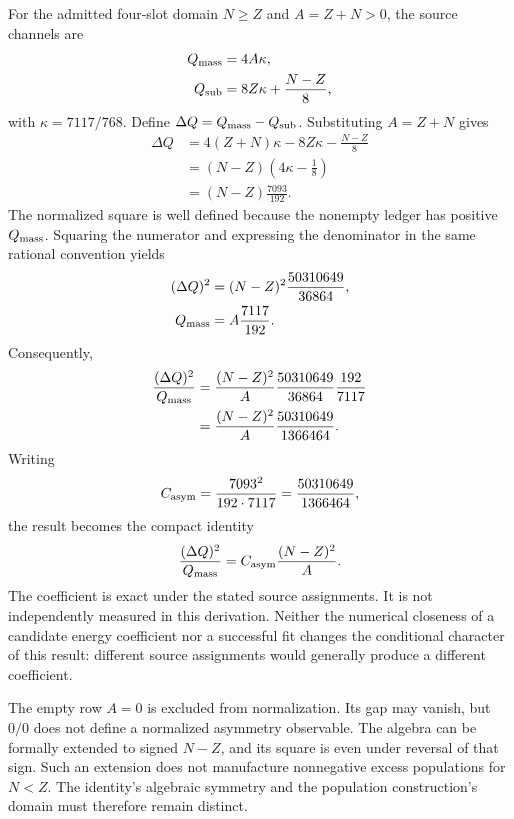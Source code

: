 For the admitted four-slot domain $N\geq Z$ and $A=Z+N>0$, the source channels are
\begin{align}
 Q_{\rm mass}&=4A\kappa,\nonumber\\
 Q_{\rm sub}&=8Z\kappa+\frac{N-Z}{8},
 \label{v2c5:channels}
\end{align}
with $\kappa=7117/768$. Define $\Delta Q=Q_{\rm mass}-Q_{\rm sub}$. Substituting $A=Z+N$ gives
\begin{align}
 \Delta Q
 &=4(Z+N)\kappa-8Z\kappa-\frac{N-Z}{8}\nonumber\\
 &=(N-Z)\left(4\kappa-\frac18\right)\nonumber\\
 &=(N-Z)\frac{7093}{192}.
 \label{v2c5:gap}
\end{align}
The normalized square is well defined because the nonempty ledger has positive $Q_{\rm mass}$. Squaring the numerator and expressing the denominator in the same rational convention yields
\begin{align}
 (\Delta Q)^2&=(N-Z)^2\frac{50310649}{36864},\nonumber\\
 Q_{\rm mass}&=A\frac{7117}{192}.
 \label{v2c5:intermediate}
\end{align}
Consequently,
\begin{align}
 \frac{(\Delta Q)^2}{Q_{\rm mass}}
 &=\frac{(N-Z)^2}{A}
   \frac{50310649}{36864}\frac{192}{7117}\nonumber\\
 &=\frac{(N-Z)^2}{A}
   \frac{50310649}{1366464}.
 \label{v2c5:identity}
\end{align}
Writing
\begin{equation}
 C_{\rm asym}=\frac{7093^2}{192\cdot7117}
             =\frac{50310649}{1366464},
 \label{v2c5:coefficient}
\end{equation}
the result becomes the compact identity
\begin{equation}
 \frac{(\Delta Q)^2}{Q_{\rm mass}}
 =C_{\rm asym}\frac{(N-Z)^2}{A}.
 \label{v2c5:compact}
\end{equation}
The coefficient is exact under the stated source assignments. It is not independently measured in this derivation. Neither the numerical closeness of a candidate energy coefficient nor a successful fit changes the conditional character of this result: different source assignments would generally produce a different coefficient.

The empty row $A=0$ is excluded from normalization. Its gap may vanish, but $0/0$ does not define a normalized asymmetry observable. The algebra can be formally extended to signed $N-Z$, and its square is even under reversal of that sign. Such an extension does not manufacture nonnegative excess populations for $N<Z$. The identity's algebraic symmetry and the population construction's domain must therefore remain distinct.

